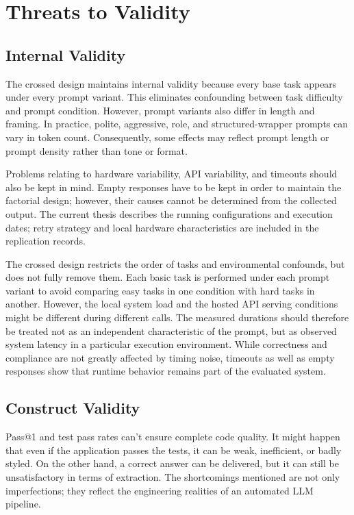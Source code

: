 \section{Threats to Validity\label{sec:threats-to-validity}}

\subsection{Internal Validity}

The crossed design maintains internal validity because every base task appears under every prompt variant. This eliminates confounding between task difficulty and prompt condition. However, prompt variants also differ in length and framing. In practice, polite, aggressive, role, and structured-wrapper prompts can vary in token count. Consequently, some effects may reflect prompt length or prompt density rather than tone or format.

Problems relating to hardware variability, API variability, and timeouts should also be kept in mind. Empty responses have to be kept in order to maintain the factorial design; however, their causes cannot be determined from the collected output. The current thesis describes the running configurations and execution dates; retry strategy and local hardware characteristics are included in the replication records.

The crossed design restricts the order of tasks and environmental confounds, but does not fully remove them. Each basic task is performed under each prompt variant to avoid comparing easy tasks in one condition with hard tasks in another. However, the local system load and the hosted API serving conditions might be different during different calls. The measured durations should therefore be treated not as an independent characteristic of the prompt, but as observed system latency in a particular execution environment. While correctness and compliance are not greatly affected by timing noise, timeouts as well as empty responses show that runtime behavior remains part of the evaluated system.

\subsection{Construct Validity}

Pass@1 and test pass rates can't ensure complete code quality. It might happen that even if the application passes the tests, it can be weak, inefficient, or badly styled. On the other hand, a correct answer can be delivered, but it can still be unsatisfactory in terms of extraction. The shortcomings mentioned are not only imperfections; they reflect the engineering realities of an automated LLM pipeline.

